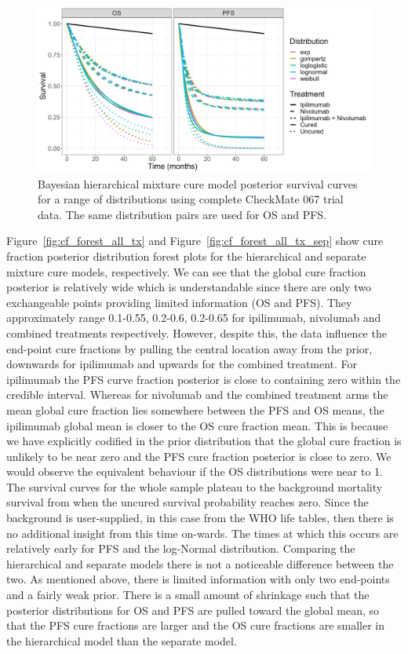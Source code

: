 \documentclass[AMA,STIX1COL]{WileyNJD-v2}
\begin{document}
\begin{figure}[!ht]
\centering
\includegraphics[width=0.7\linewidth]{plot_S_overlay.png}
\caption{\label{fig:S_overlay} Bayesian hierarchical mixture cure model posterior survival curves for a range of distributions using complete CheckMate 067 trial data. The same distribution pairs are used for OS and PFS.}
\end{figure}

Figure~\ref{fig:cf_forest_all_tx} and Figure~\ref{fig:cf_forest_all_tx_sep} show cure fraction posterior distribution forest plots for the hierarchical and separate mixture cure models, respectively. 
We can see that the global cure fraction posterior is relatively wide which is understandable since there are only two exchangeable points providing limited information (OS and PFS).
They approximately range 0.1-0.55, 0.2-0.6, 0.2-0.65 for ipilimumab, nivolumab and combined treatments respectively. 
However, despite this, the data influence the end-point cure fractions by pulling the central location away from the prior, downwards for ipilimumab and upwards for the combined treatment.
For ipilimumab the PFS curve fraction posterior is close to containing zero within the credible interval.
Whereas for nivolumab and the combined treatment arms the mean global cure fraction lies somewhere between the PFS and OS means, the ipilimumab global mean is closer to the OS cure fraction mean. This is because we have explicitly codified in the prior distribution that the global cure fraction is unlikely to be near zero and the PFS cure fraction posterior is close to zero.
We would observe the equivalent behaviour if the OS distributions were near to 1.
The survival curves for the whole sample plateau to the background mortality survival from when the uncured survival probability reaches zero.
Since the background is user-supplied, in this case from the WHO life tables, then there is no additional insight from this time on-wards.
The times at which this occurs are relatively early for PFS and the log-Normal distribution.
Comparing the hierarchical and separate models there is not a noticeable difference between the two.
As mentioned above, there is limited information with only two end-points and a fairly weak prior.
There is a small amount of shrinkage such that the posterior distributions for OS and PFS are pulled toward the global mean, so that the PFS cure fractions are larger and the OS cure fractions are smaller in the hierarchical model than the separate model.
\end{document}
